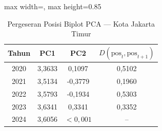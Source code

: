 \begin{table}[H]
\centering
\caption{Pergeseran Posisi Biplot PCA --- Kota Jakarta Timur} \label{tab:appjarak_pca_skor_kota_jakarta_timur}
\begin{adjustbox}{max width=\textwidth, max height=0.85\textheight}
\begin{tabular}{|c|c|c|c|}
\hline
\textbf{Tahun} & \textbf{PC1} & \textbf{PC2} & \textbf{$D(\text{pos}_t, \text{pos}_{t+1})$} \\
\hline
2020 & 3,3633 & 0,1097 & 0,5102 \\
2021 & 3,5134 & -0,3779 & 0,1960 \\
2022 & 3,5793 & -0,1934 & 0,5303 \\
2023 & 3,6341 & 0,3341 & 0,3352 \\
2024 & 3,6056 & $< 0,001$ & -- \\
\hline
\end{tabular}
\end{adjustbox}
\end{table}